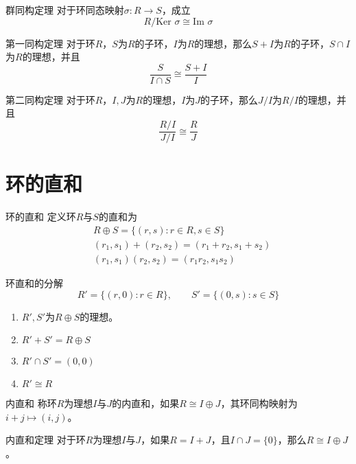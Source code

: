 \documentclass[lang = cn, scheme = chinese, thmcnt = section]{elegantbook}
\begin{document}
\begin{theorem}{群同构定理}
	对于环同态映射$\sigma:R\to S$，成立
	$$
	R/\text{Ker }\sigma\cong\text{Im }\sigma
	$$
\end{theorem}

\begin{theorem}{第一同构定理}
	对于环$R$，$S$为$R$的子环，$I$为$R$的理想，那么$S+I$为$R$的子环，$S\cap I$为$R$的理想，并且
	$$
	\frac{S}{I\cap S}\cong \frac{S+I}{I}
	$$
\end{theorem}

\begin{theorem}{第二同构定理}
	对于环$R$，$I,J$为$R$的理想，$I$为$J$的子环，那么$J/I$为$R/I$的理想，并且
	$$
	\frac{R/I}{J/I}\cong \frac{R}{J}
	$$
\end{theorem}

\section{环的直和}

\begin{definition}{环的直和}
	定义环$R$与$S$的直和为
	\begin{align*}
		&R\oplus S=\{ (r,s):r\in R,s\in S \}\\
		&(r_1,s_1)+(r_2,s_2)=(r_1+r_2,s_1+s_2)\\
		&(r_1,s_1)(r_2,s_2)=(r_1r_2,s_1s_2)
	\end{align*}
\end{definition}

\begin{definition}{环直和的分解}
	$$
	R'=\{ (r,0):r\in R \},\qquad 
	S'=\{ (0,s):s\in S \}
	$$
\end{definition}

\begin{proposition}
	\begin{enumerate}
		\item $R',S'$为$R\oplus S$的理想。
		\item $R'+S'=R\oplus S$
		\item $R'\cap S'={(0,0)}$
		\item $R'\cong R$
	\end{enumerate}
\end{proposition}

\begin{definition}{内直和}
	称环$R$为理想$I$与$J$的内直和，如果$R\cong I\oplus J$，其环同构映射为$i+j\mapsto(i,j)$。
\end{definition}

\begin{theorem}{内直和定理}
	对于环$R$为理想$I$与$J$，如果$R=I+J$，且$I\cap J=\{0\}$，那么$R\cong I\oplus J$。
\end{theorem}
\end{document}
